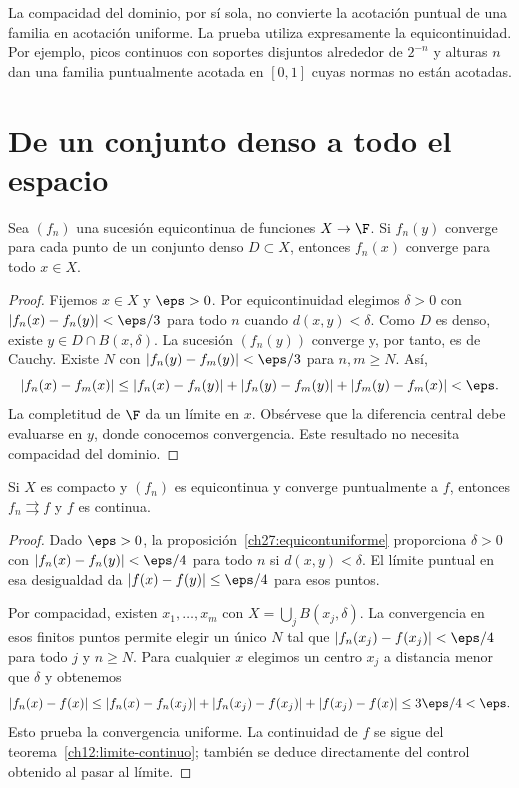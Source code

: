 La compacidad del dominio, por sí sola, no convierte la acotación puntual de una familia en acotación uniforme. La prueba utiliza expresamente la equicontinuidad. Por ejemplo, picos continuos con soportes disjuntos alrededor de $2^{-n}$ y alturas $n$ dan una familia puntualmente acotada en $[0,1]$ cuyas normas no están acotadas.

\section{De un conjunto denso a todo el espacio}
\begin{proposicion}\label{ch27:denso}
Sea $(f_n)$ una sucesión equicontinua de funciones $X\to\F$. Si $f_n(y)$ converge para cada punto de un conjunto denso $D\subset X$, entonces $f_n(x)$ converge para todo $x\in X$.
\end{proposicion}
\begin{proof}
Fijemos $x\in X$ y $\eps>0$. Por equicontinuidad elegimos $\delta>0$ con $|f_n(x)-f_n(y)|<\eps/3$ para todo $n$ cuando $d(x,y)<\delta$. Como $D$ es denso, existe $y\in D\cap B(x,\delta)$. La sucesión $(f_n(y))$ converge y, por tanto, es de Cauchy. Existe $N$ con $|f_n(y)-f_m(y)|<\eps/3$ para $n,m\ge N$. Así,
\[
 |f_n(x)-f_m(x)|\le|f_n(x)-f_n(y)|+|f_n(y)-f_m(y)|+|f_m(y)-f_m(x)|<\eps.
\]
La completitud de $\F$ da un límite en $x$. Obsérvese que la diferencia central debe evaluarse en $y$, donde conocemos convergencia. Este resultado no necesita compacidad del dominio.
\end{proof}

\begin{proposicion}\label{ch27:puntualuniforme}
Si $X$ es compacto y $(f_n)$ es equicontinua y converge puntualmente a $f$, entonces $f_n\rightrightarrows f$ y $f$ es continua.
\end{proposicion}
\begin{proof}
Dado $\eps>0$, la proposición~\ref{ch27:equicontuniforme} proporciona $\delta>0$ con $|f_n(x)-f_n(y)|<\eps/4$ para todo $n$ si $d(x,y)<\delta$. El límite puntual en esa desigualdad da $|f(x)-f(y)|\le\eps/4$ para esos puntos.

Por compacidad, existen $x_1,\ldots,x_m$ con $X=\bigcup_jB(x_j,\delta)$. La convergencia en esos finitos puntos permite elegir un único $N$ tal que $|f_n(x_j)-f(x_j)|<\eps/4$ para todo $j$ y $n\ge N$. Para cualquier $x$ elegimos un centro $x_j$ a distancia menor que $\delta$ y obtenemos
\[
 |f_n(x)-f(x)|
 \le |f_n(x)-f_n(x_j)|+|f_n(x_j)-f(x_j)|+|f(x_j)-f(x)|
 \le3\eps/4<\eps.
\]
Esto prueba la convergencia uniforme. La continuidad de $f$ se sigue del teorema~\ref{ch12:limite-continuo}; también se deduce directamente del control obtenido al pasar al límite.
\end{proof}

